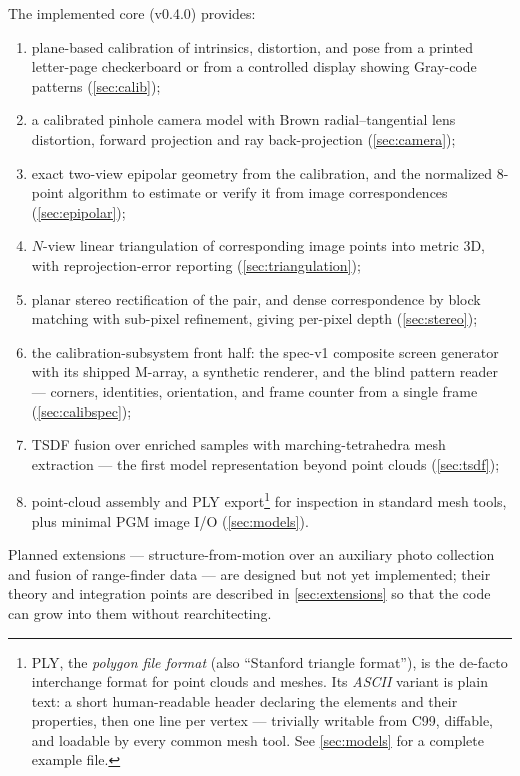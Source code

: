 \documentclass[11pt]{article}
\theoremstyle{definition}
\begin{document}
The implemented core (v0.4.0) provides:
\begin{enumerate}
  \item plane-based calibration of intrinsics, distortion, and pose from a
        printed letter-page checkerboard or from a controlled display
        showing Gray-code patterns (\autoref{sec:calib});
  \item a calibrated pinhole camera model with Brown radial--tangential lens
        distortion, forward projection and ray back-projection
        (\autoref{sec:camera});
  \item exact two-view epipolar geometry from the calibration, and the
        normalized 8-point algorithm to estimate or verify it from image
        correspondences (\autoref{sec:epipolar});
  \item $N$-view linear triangulation of corresponding image points into
        metric 3D, with reprojection-error reporting
        (\autoref{sec:triangulation});
  \item planar stereo rectification of the pair, and dense correspondence by
        block matching with sub-pixel refinement, giving per-pixel depth
        (\autoref{sec:stereo});
  \item the calibration-subsystem front half: the spec-v1 composite
        screen generator with its shipped M-array, a synthetic renderer,
        and the blind pattern reader --- corners, identities,
        orientation, and frame counter from a single frame
        (\autoref{sec:calibspec});
  \item TSDF fusion over enriched samples with marching-tetrahedra mesh
        extraction --- the first model representation beyond point
        clouds (\autoref{sec:tsdf});
  \item point-cloud assembly and PLY
        export\footnote{PLY, the \emph{polygon file format} (also
        ``Stanford triangle format''), is the de-facto interchange
        format for point clouds and meshes. Its \emph{ASCII} variant is
        plain text: a short human-readable header declaring the
        elements and their properties, then one line per vertex ---
        trivially writable from C99, diffable, and loadable by every
        common mesh tool. See \autoref{sec:models} for a complete
        example file.} for inspection in standard mesh tools, plus
        minimal PGM image I/O (\autoref{sec:models}).
\end{enumerate}

Planned extensions --- structure-from-motion over an auxiliary photo
collection and fusion of range-finder data --- are designed but not yet
implemented; their theory and integration points are described in
\autoref{sec:extensions} so that the code can grow into them without
rearchitecting.
\end{document}
